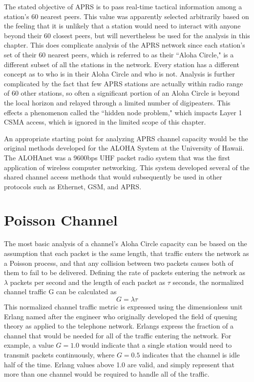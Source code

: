 The stated objective of APRS is to
pass real-time tactical information among a station's 60 nearest peers.
This value was apparently selected arbitrarily based on the feeling that
it is unlikely that a station would need to interact with anyone beyond their 60
closest peers, but will nevertheless be used for the analysis in this chapter.
This does complicate analysis of the APRS network since each station's set of
their 60 nearest peers, which is referred to as their ``Aloha Circle,"
is a different subset of all the stations in the network.
Every station has a different concept as to who is in their Aloha Circle and who
is not.
Analysis is further complicated by
the fact that few APRS stations are actually within radio range of 60 other stations,
so often a significant portion of an Aloha Circle is
beyond the local horizon and relayed through a limited number of digipeaters.
This effects a phenomenon called the ``hidden node problem," which impacts
Layer 1 CSMA access,
which is ignored in the limited scope of this chapter.

An appropriate starting point for analyzing APRS channel capacity would be the original methods
developed for the ALOHA System at the University of Hawaii\cite{packetthroughput}.
The ALOHAnet was a 9600bps UHF packet radio system that was the first application of 
wireless computer networking.
This system developed several of the shared channel access methods 
that would subsequently be used in other protocols such as Ethernet, GSM, and APRS.

\section{Poisson Channel}

The most basic analysis of a channel's Aloha Circle capacity can be based on the assumption that
each packet is the same length, 
that traffic enters the network as a Poisson process,
and that any collision between two packets causes both of them to fail to be delivered.
Defining the rate of packets entering the network as $\lambda$ packets per second and
the length of each packet as $\tau$ seconds,
the normalized channel traffic G can be
calculated as
\begin{equation}
	G = \lambda \tau
\end{equation}
This normalized channel traffic metric is expressed
using the dimensionless unit Erlang named after the engineer who originally
developed the field of queuing theory as applied to the telephone network.
Erlangs express the fraction of a channel that would be needed for all
of the traffic entering the network.
For example, a value $G=1.0$ would indicate that
a single station would need to transmit packets continuously,
where $G=0.5$ indicates that the channel is idle half of the time.
Erlang values above 1.0 are valid, and simply represent that more than one
channel would be required to handle all of the traffic.

